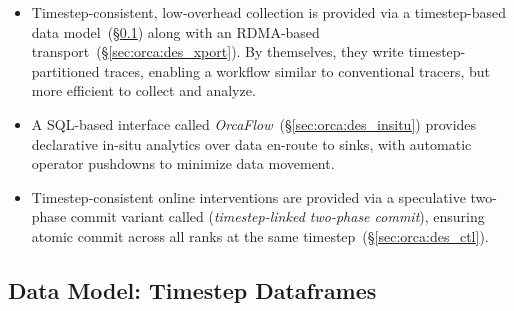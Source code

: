 \begin{itemize}[leftmargin=*]
  \item Timestep-consistent, low-overhead collection is provided via a timestep-based data model~(\S\ref{sec:orca:des_model}) along with an RDMA-based transport~(\S\ref{sec:orca:des_xport}).
        By themselves, they write timestep-partitioned traces, enabling a workflow similar to conventional
        tracers, but more efficient to collect and analyze.
  \item A SQL-based interface called \emph{OrcaFlow}~(\S\ref{sec:orca:des_insitu})
        provides declarative in-situ analytics over data en-route to sinks, with automatic operator pushdowns to minimize data movement.
  \item Timestep-consistent online interventions are provided via a speculative two-phase commit variant called \twopc{} (\emph{timestep-linked two-phase commit}), ensuring atomic commit across all ranks at the same timestep~(\S\ref{sec:orca:des_ctl}).
\end{itemize}


\subsection{Data Model: Timestep Dataframes}
\label{sec:orca:des_model}


